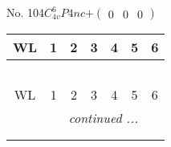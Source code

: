 \documentclass[fleqn,9pt,landscape]{jsarticle}
\begin{document}
\newpage
No. 104\quad$C_{4v}^{6}$\quad$P4nc$\quad[ tetragonal ]\quad$+\begin{pmatrix} 0 & 0 & 0 \end{pmatrix}$
\begin{center}
\renewcommand{\arraystretch}{1.2}
\begin{longtable}{ccccccc}
 \hline \hline
WL & 1 & 2 & 3 & 4 & 5 & 6 \\ \hline \endfirsthead

\multicolumn{6}{l}{\tablename\ \thetable{}} \\
 \hline \hline
WL & 1 & 2 & 3 & 4 & 5 & 6 \\ \hline \endhead

 \hline \hline
\multicolumn{6}{r}{\footnotesize\it continued ...} \\ \endfoot

 \hline \hline
\multicolumn{6}{r}{} \\ \endlastfoot


\end{longtable}
\end{center}
\end{document}
